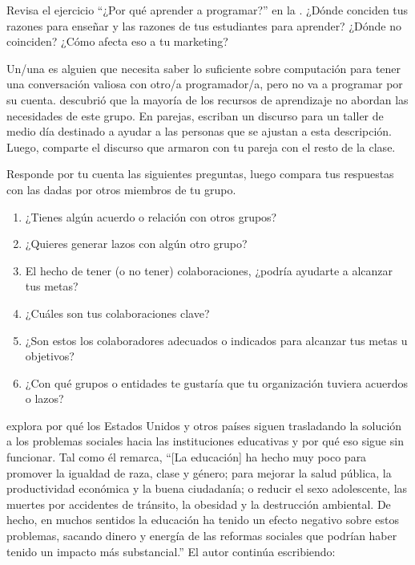 Revisa el ejercicio ``¿Por qué aprender a programar?'' en la .
¿Dónde conciden tus razones para enseñar y las razones de tus estudiantes para aprender?
¿Dónde no coinciden?
¿Cómo afecta eso a tu marketing?


Un/una 
es alguien que necesita saber lo suficiente sobre computación
para tener una conversación valiosa con otro/a programador/a,
pero no va a programar por su cuenta.
\cite{Wang2018} descubrió que la mayoría de los recursos de aprendizaje no abordan las necesidades de este grupo.
En parejas,
escriban un discurso para un taller de medio día destinado a ayudar a las personas que se ajustan a esta descripción.
Luego, comparte el discurso que armaron con tu pareja con el resto de la clase.

Responde por tu cuenta las siguientes preguntas,
luego compara tus respuestas con las dadas por otros miembros de tu grupo.

\begin{enumerate}

\item
¿Tienes algún acuerdo o relación con otros grupos?

\item
¿Quieres generar lazos con algún otro grupo?

\item
El hecho de tener (o no tener) colaboraciones, 
¿podría ayudarte a alcanzar tus metas?

\item
¿Cuáles son tus colaboraciones clave?

\item
¿Son estos los colaboradores adecuados o indicados para alcanzar tus metas u objetivos?

\item
¿Con qué grupos o entidades te gustaría que tu organización
tuviera acuerdos o lazos?



\end{enumerate}


\cite{Laba2008} explora por qué los Estados Unidos y otros países
siguen trasladando la solución a los problemas sociales hacia las instituciones educativas 
y por qué eso sigue sin funcionar.
Tal como él remarca,
``[La educación] ha hecho muy poco para promover la igualdad de raza, clase y género;
para mejorar la salud pública, la productividad económica y la buena ciudadanía;
o reducir el sexo adolescente, las muertes por accidentes de tránsito, la obesidad y la destrucción ambiental.
De hecho,
en muchos sentidos la educación ha tenido un efecto negativo sobre estos problemas,
sacando dinero y energía de las reformas sociales que podrían haber tenido un impacto más substancial.''
El autor continúa escribiendo: 

